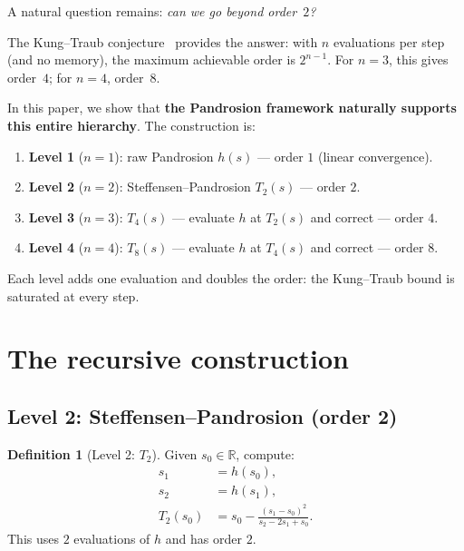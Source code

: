 \documentclass[11pt,a4paper]{article}
\theoremstyle{definition}
\newtheorem{definition}{Definition}[section]
\newcommand{\RR}{\mathbb{R}}
\begin{document}
A natural question remains: \emph{can we go beyond order~$2$?}

\medskip

The Kung--Traub conjecture~\cite{kungtraub} provides the answer: with $n$ evaluations per step (and no memory), the maximum achievable order is $2^{n-1}$.  For $n=3$, this gives order~$4$; for $n=4$, order~$8$.

\medskip

In this paper, we show that \textbf{the Pandrosion framework naturally supports this entire hierarchy}.  The construction is:
\begin{enumerate}
  \item \textbf{Level 1} ($n=1$): raw Pandrosion $h(s)$ --- order $1$ (linear convergence).
  \item \textbf{Level 2} ($n=2$): Steffensen--Pandrosion $T_2(s)$ --- order $2$.
  \item \textbf{Level 3} ($n=3$): $T_4(s)$ --- evaluate $h$ at $T_2(s)$ and correct --- order $4$.
  \item \textbf{Level 4} ($n=4$): $T_8(s)$ --- evaluate $h$ at $T_4(s)$ and correct --- order $8$.
\end{enumerate}
Each level adds one evaluation and doubles the order: the Kung--Traub bound is saturated at every step.

\section{The recursive construction}
\label{sec:construction}

\subsection{Level 2: Steffensen--Pandrosion (order 2)}

\begin{definition}[Level 2: $T_2$]
Given $s_0 \in \RR$, compute:
\begin{align}
  s_1 &= h(s_0), \label{eq:t2_s1} \\
  s_2 &= h(s_1), \label{eq:t2_s2} \\
  T_2(s_0) &= s_0 - \frac{(s_1 - s_0)^2}{s_2 - 2s_1 + s_0}. \label{eq:t2}
\end{align}
This uses $2$ evaluations of $h$ and has order $2$.
\end{definition}
\end{document}
